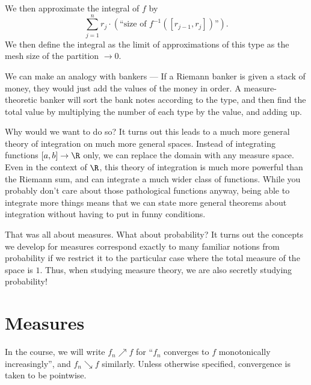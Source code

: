 \documentclass[a4paper]{article}
\begin{document}
We then approximate the integral of $f$ by
\[
  \sum_{j = 1}^n r_j \cdot (\text{``size of }f^{-1}([r_{j - 1}, r_j])\text{''}).
\]
We then define the integral as the limit of approximations of this type as the mesh size of the partition $\to 0$.
\begin{center}
\end{center}
We can make an analogy with bankers --- If a Riemann banker is given a stack of money, they would just add the values of the money in order. A measure-theoretic banker will sort the bank notes according to the type, and then find the total value by multiplying the number of each type by the value, and adding up.

Why would we want to do so? It turns out this leads to a much more general theory of integration on much more general spaces. Instead of integrating functions $[a, b] \to \R$ only, we can replace the domain with any measure space. Even in the context of $\R$, this theory of integration is much more powerful than the Riemann sum, and can integrate a much wider class of functions. While you probably don't care about those pathological functions anyway, being able to integrate more things means that we can state more general theorems about integration without having to put in funny conditions.

That was all about measures. What about probability? It turns out the concepts we develop for measures correspond exactly to many familiar notions from probability if we restrict it to the particular case where the total measure of the space is $1$. Thus, when studying measure theory, we are also secretly studying probability!

\section{Measures}
In the course, we will write $f_n \nearrow f$ for ``$f_n$ converges to $f$ monotonically increasingly'', and $f_n \searrow f$ similarly. Unless otherwise specified, convergence is taken to be pointwise.
\end{document}
